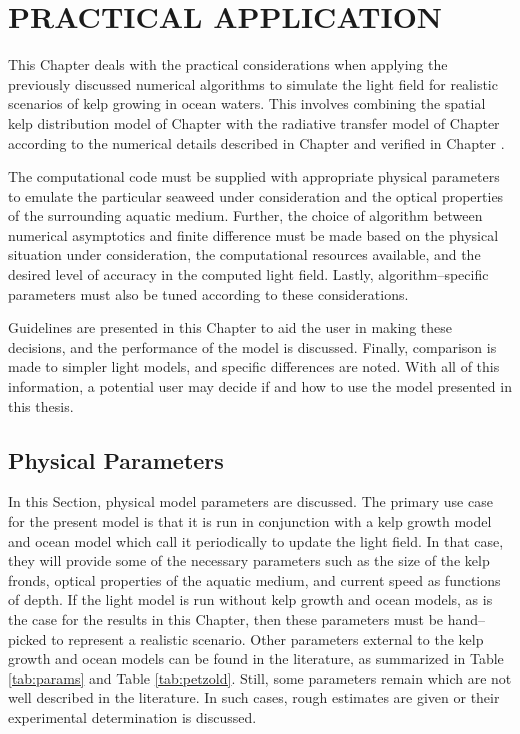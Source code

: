 \chapter{PRACTICAL APPLICATION}
\label{chap:application}

This Chapter deals with the practical considerations when applying the previously discussed numerical algorithms to simulate the light field for realistic scenarios of kelp growing in ocean waters.
This involves combining the spatial kelp distribution model of Chapter \Rom{\ref{chap:kelp}} with the radiative transfer model of Chapter \Rom{\ref{chap:light}} according to the numerical details described in Chapter \Rom{\ref{chap:numerical}} and verified in Chapter \Rom{\ref{chap:model_analysis}}.

The computational code must be supplied with appropriate physical parameters to emulate the particular seaweed under consideration and the optical properties of the surrounding aquatic medium.
Further, the choice of algorithm between numerical asymptotics and finite difference must be made based on the physical situation under consideration, the computational resources available, and the desired level of accuracy in the computed light field.
Lastly, algorithm--specific parameters must also be tuned according to these considerations.

Guidelines are presented in this Chapter to aid the user in making these decisions, and the performance of the model is discussed.
Finally, comparison is made to simpler light models, and specific differences are noted.
With all of this information, a potential user may decide if and how to use the model presented in this thesis.

\section{Physical Parameters}
\label{sec:parameters}
In this Section, physical model parameters are discussed.
The primary use case for the present model is that it is run in conjunction with a kelp growth model and ocean model
which call it periodically to update the light field.
In that case, they will provide some of the necessary parameters such as the size of the kelp fronds, optical properties of the aquatic medium, and current speed as functions of depth.
If the light model is run without kelp growth and ocean models, as is the case for the results in this Chapter, then these parameters must be hand--picked to represent a realistic scenario.
Other parameters external to the kelp growth and ocean models can be found in the literature,
as summarized in Table \ref{tab:params} and Table \ref{tab:petzold}.
Still, some parameters remain which are not well described in the literature.
In such cases, rough estimates are given or their experimental determination is discussed.


